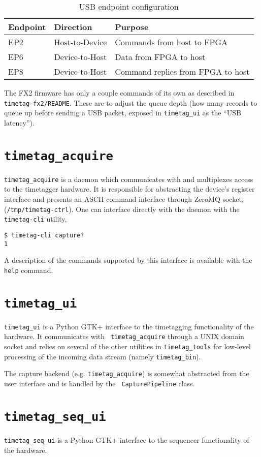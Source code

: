 \begin{table}
  \begin{tabular}{|lll|}
    \hline
    Endpoint & Direction      & Purpose \\
    \hline
    EP2      & Host-to-Device & Commands from host to FPGA \\
    EP6      & Device-to-Host & Data from FPGA to host \\
    EP8      & Device-to-Host & Command replies from FPGA to host \\
    \hline
  \end{tabular}
  \caption{USB endpoint configuration}
  \label{Table:Endpoints}
\end{table}

The FX2 firmware has only a couple commands of its own as described in
{\tt timetag-fx2/README}. These are to adjust the queue depth (how
many records to queue up before sending a USB packet, exposed in
{\tt timetag\_ui} as the ``USB latency'').

\section{\tt timetag\_acquire}
{\tt timetag\_acquire} is a daemon which communicates with and
multiplexes access to the timetagger hardware. It is responsible for
abstracting the device's register interface and presents an ASCII
command interface through ZeroMQ socket,
({\tt /tmp/timetag-ctrl}). One can interface directly with the daemon
with the {\tt timetag-cli} utility,

\begin{verbatim}
$ timetag-cli capture?
1
\end{verbatim}

A description of the commands supported by this interface is available
with the {\tt help} command.

\section{\tt timetag\_ui}

{\tt timetag\_ui} is a Python GTK+ interface to the timetagging
functionality of the hardware. It communicates with {\tt
timetag\_acquire} through a UNIX domain socket and relies on several
of the other utilities in {\tt timetag\_tools} for low-level
processing of the incoming data stream (namely {\tt timetag\_bin}).

The capture backend (e.g. {\tt timetag\_acquire}) is somewhat
abstracted from the user interface and is handled by the {\tt
CapturePipeline} class.

\section{\tt timetag\_seq\_ui}

{\tt timetag\_seq\_ui} is a Python GTK+ interface to the sequencer
functionality of the hardware.

